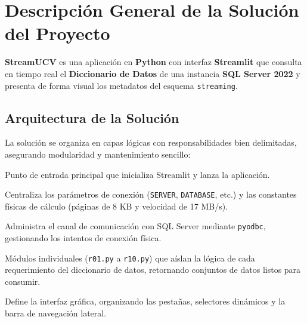 \documentclass[11pt,a4paper]{article}
\begin{document}
\newpage
\tableofcontents
\newpage

\section{Descripción General de la Solución del Proyecto}
\textbf{StreamUCV} es una aplicación en \textbf{Python} con interfaz \textbf{Streamlit} que consulta en tiempo real el \textbf{Diccionario de Datos} de una instancia \textbf{SQL Server 2022} y presenta de forma visual los metadatos del esquema \texttt{streaming}.

\subsection{Arquitectura de la Solución}
La solución se organiza en capas lógicas con responsabilidades bien delimitadas, asegurando modularidad y mantenimiento sencillo:
\begin{description}[leftmargin=4.2cm, labelwidth=3.9cm, style=sameline, font=\ttfamily\bfseries\color{ucvblue}]
    \item[main.py] Punto de entrada principal que inicializa Streamlit y lanza la aplicación.
    \item[app/config.py] Centraliza los parámetros de conexión (\texttt{SERVER}, \texttt{DATABASE}, etc.) y las constantes físicas de cálculo (páginas de 8 KB y velocidad de 17 MB/s).
    \item[app/connection.py] Administra el canal de comunicación con SQL Server mediante \texttt{pyodbc}, gestionando los intentos de conexión física.
    \item[app/queries/] Módulos individuales (\texttt{r01.py} a \texttt{r10.py}) que aíslan la lógica de cada requerimiento del diccionario de datos, retornando conjuntos de datos listos para consumir.
    \item[app/ui/streamlit\_app.py] Define la interfaz gráfica, organizando las pestañas, selectores dinámicos y la barra de navegación lateral.
\end{description}
\end{document}
